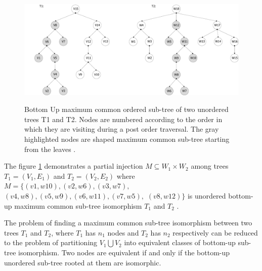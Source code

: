 \documentclass{report}
\begin{document}
\begin{figure}[th]
  \centering
  \includegraphics[scale=0.45]{Figures/algorithms/BU/bottom-up-max-common-example.pdf}\\[0.1cm]
  \caption[Bottom Up maximum common ordered sub-tree of two unordered trees T1 and T2]{Bottom Up maximum common ordered sub-tree of two unordered trees T1 and T2. Nodes are numbered according to the order in which they are visiting during a post order traversal. The gray highlighted nodes are shaped maximum common sub-tree starting from the leaves \cite{valiente}.}
  \label{fig:bottom-up-max-common-example}
\end{figure}

The figure \ref{fig:bottom-up-max-common-example} demonstrates a partial injection $M \subseteq W_{1} \times  W_{2}$ among trees $ T_{1} = ( V_{1}, E_{1})$ and  $ T_{2} = ( V_{2}, E_{2})$ where $M  = \{ (v1,w10),  (v2,w6), (v3,w7), $ \\
$(v4,w8),  (v5,w9),  (v6,w11),  (v7,w5), $  $ (v8,w12)\}$ is unordered bottom-up maximum common sub-tree isomorphism $ T_{1}$ and $ T_{2 }$ \cite{valiente}.

The problem of finding a maximum common sub-tree isomorphism between two trees $ T_{1}$ and $ T_{2 }$, where $ T_{1}$ has $n_{1}$ nodes and $ T_{2}$ has $n_{2}$ respectively can be reduced to the problem of partitioning $ V_{1}\bigcup V_{2}$ into equivalent classes of bottom-up sub-tree isomorphism. Two nodes are equivalent if and only if the bottom-up unordered sub-tree rooted at them are isomorphic.
\end{document}
